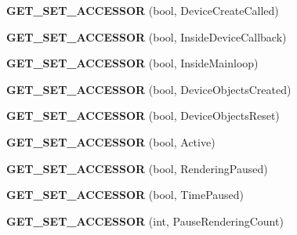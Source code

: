 \begin{DoxyCompactItemize}
\item 
\hypertarget{class_d_x_u_t_state_a6dfe7e675d3521ea6c945041a4e8ebeb}{{\bfseries G\+E\+T\+\_\+\+S\+E\+T\+\_\+\+A\+C\+C\+E\+S\+S\+O\+R} (bool, Device\+Create\+Called)}\label{class_d_x_u_t_state_a6dfe7e675d3521ea6c945041a4e8ebeb}

\item 
\hypertarget{class_d_x_u_t_state_ae57476aa86bbfa1a7cc419d387a2d0ee}{{\bfseries G\+E\+T\+\_\+\+S\+E\+T\+\_\+\+A\+C\+C\+E\+S\+S\+O\+R} (bool, Inside\+Device\+Callback)}\label{class_d_x_u_t_state_ae57476aa86bbfa1a7cc419d387a2d0ee}

\item 
\hypertarget{class_d_x_u_t_state_a6474dc67d3b1b2572a8bb2476709b516}{{\bfseries G\+E\+T\+\_\+\+S\+E\+T\+\_\+\+A\+C\+C\+E\+S\+S\+O\+R} (bool, Inside\+Mainloop)}\label{class_d_x_u_t_state_a6474dc67d3b1b2572a8bb2476709b516}

\item 
\hypertarget{class_d_x_u_t_state_a07b477d9aa86b43b42ed3178c15e8482}{{\bfseries G\+E\+T\+\_\+\+S\+E\+T\+\_\+\+A\+C\+C\+E\+S\+S\+O\+R} (bool, Device\+Objects\+Created)}\label{class_d_x_u_t_state_a07b477d9aa86b43b42ed3178c15e8482}

\item 
\hypertarget{class_d_x_u_t_state_a4c31ee243c293f73584d675041eaea2b}{{\bfseries G\+E\+T\+\_\+\+S\+E\+T\+\_\+\+A\+C\+C\+E\+S\+S\+O\+R} (bool, Device\+Objects\+Reset)}\label{class_d_x_u_t_state_a4c31ee243c293f73584d675041eaea2b}

\item 
\hypertarget{class_d_x_u_t_state_a86fa93ddd4667d88896569250f131444}{{\bfseries G\+E\+T\+\_\+\+S\+E\+T\+\_\+\+A\+C\+C\+E\+S\+S\+O\+R} (bool, Active)}\label{class_d_x_u_t_state_a86fa93ddd4667d88896569250f131444}

\item 
\hypertarget{class_d_x_u_t_state_a1201e10a8729dec22b252ff1682a46c0}{{\bfseries G\+E\+T\+\_\+\+S\+E\+T\+\_\+\+A\+C\+C\+E\+S\+S\+O\+R} (bool, Rendering\+Paused)}\label{class_d_x_u_t_state_a1201e10a8729dec22b252ff1682a46c0}

\item 
\hypertarget{class_d_x_u_t_state_a2b593e9cf8d3cbb8158b45ff051a33e7}{{\bfseries G\+E\+T\+\_\+\+S\+E\+T\+\_\+\+A\+C\+C\+E\+S\+S\+O\+R} (bool, Time\+Paused)}\label{class_d_x_u_t_state_a2b593e9cf8d3cbb8158b45ff051a33e7}

\item 
\hypertarget{class_d_x_u_t_state_a458e562a6427b58eb4d41dc932888b07}{{\bfseries G\+E\+T\+\_\+\+S\+E\+T\+\_\+\+A\+C\+C\+E\+S\+S\+O\+R} (int, Pause\+Rendering\+Count)}\label{class_d_x_u_t_state_a458e562a6427b58eb4d41dc932888b07}


\end{DoxyCompactItemize}
